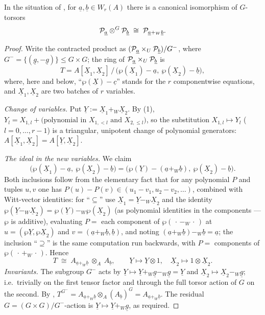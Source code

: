 \documentclass[11pt]{article}
\newcommand{\wv}[1]{\underline{#1}}                 %
\begin{document}
\begin{lemma}\label{lem:additivity}
In the situation of , for
$\wv a,\wv b\in W_r(A)$ there is a canonical isomorphism of $G$-torsors
\[
\cP_{\wv a}\otimes^{G}\cP_{\wv b}\;\cong\;\cP_{\wv a+_W\wv b}.
\]
\end{lemma}

\begin{proof}
Write the contracted product as
$(\cP_{\wv a}\times_U\cP_{\wv b})/G^{-}$, where
$G^-=\{(\wv g,-\wv g)\}\le G\times G$; the ring of
$\cP_{\wv a}\times_U\cP_{\wv b}$ is
\[
T=A[\wv X_1,\wv X_2]\,/\,
\big(\wp(\wv X_1)-\wv a,\ \wp(\wv X_2)-\wv b\big),
\]
where, here and below, ``$\wp(\wv X)-\wv c$'' stands for the $r$
componentwise equations, and $\wv X_1,\wv X_2$ are two batches of $r$
variables.

\emph{Change of variables.}  Put $\wv Y:=\wv X_1+_W\wv X_2$.  By
(1),
$Y_l=X_{1,l}+\big(\text{polynomial in }X_{1,<l}\text{ and }X_{2,\le l}\big)$,
so the substitution $X_{1,l}\mapsto Y_l$ ($l=0,\dots,r-1$) is a
triangular, unipotent change of polynomial generators:
$A[\wv X_1,\wv X_2]=A[\wv Y,\wv X_2]$.

\emph{The ideal in the new variables.}  We claim
\[
\big(\wp(\wv X_1)-\wv a,\ \wp(\wv X_2)-\wv b\big)
=\big(\wp(\wv Y)-(\wv a+_W\wv b),\ \wp(\wv X_2)-\wv b\big).
\]
Both inclusions follow from the elementary fact that for any polynomial
$P$ and tuples $u,v$ one has $P(u)-P(v)\in(u_1-v_1,u_2-v_2,\dots)$,
combined with Witt-vector identities:
for ``$\subseteq$'' use $\wv X_1=\wv Y-_W\wv X_2$ and the identity
$\wp(\wv Y-_W\wv X_2)=\wp(\wv Y)-_W\wp(\wv X_2)$ (as polynomial identities
in the components --- $\wp$ is additive), evaluating $P=$ each component of
$\wp(\,\cdot\,-_W\,\cdot\,)$ at
$u=(\wp\wv Y,\wp\wv X_2)$ and $v=(\wv a+_W\wv b,\wv b)$, and noting
$(\wv a+_W\wv b)-_W\wv b=\wv a$; the inclusion ``$\supseteq$'' is the same
computation run backwards, with $P=$ components of
$\wp(\,\cdot\,+_W\,\cdot\,)$.  Hence
\[
T\;\cong\;A_{\wv a+_W\wv b}\ \otimes_A\ A_{\wv b},
\qquad \wv Y\mapsto \wv Y\otimes 1,\quad \wv X_2\mapsto 1\otimes\wv X_2 .
\]
\emph{Invariants.}  The subgroup $G^-$ acts by
$\wv Y\mapsto\wv Y+_W\wv g-_W\wv g=\wv Y$ and
$\wv X_2\mapsto\wv X_2-_W\wv g$; i.e.\ trivially on the first tensor
factor and through the full torsor action of $G$ on the second.  By
,
$T^{G^-}=A_{\wv a+_W\wv b}\otimes_A(A_{\wv b})^{G}
=A_{\wv a+_W\wv b}$.
The residual $G=(G\times G)/G^-$-action is
$\wv Y\mapsto\wv Y+_W\wv g$, as required.
\end{proof}
\end{document}

